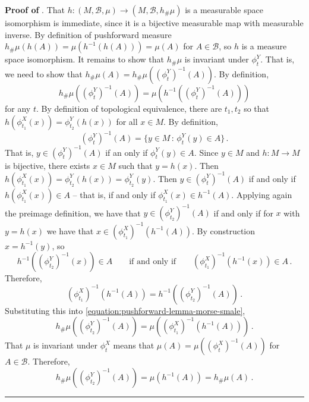 \documentclass[12pt]{article}
\newcommand{\BlackBox}{\rule{1.5ex}{1.5ex}}  %
\begin{document}
\vspace{0.5em}
\noindent
{\bf Proof of }. That $h: (M, \mathcal{B}, \mu) \rightarrow (M, \mathcal{B}, h_{\#}\mu)$ is a measurable space isomorphism is immediate, since it is a bijective measurable map with measurable inverse. By definition of pushforward measure $h_{\#}\mu(h(A)) = \mu(h^{-1}(h(A)))= \mu(A)$ for $A \in \mathcal{B}$, so $h$ is a measure space isomorphism. It remains to show that $h_{\#}\mu$ is invariant under $\phi_t^Y$. That is, we need to show that $h_{\#}\mu(A)=h_{\#}\mu((\phi_t^Y)^{-1}(A))$. By definition,
\begin{equation}
\label{equation:pushforward-lemma-morse-smale}
    h_{\#}\mu((\phi_t^Y)^{-1}(A)) = \mu\left(h^{-1} ( (\phi_t^Y)^{-1}(A))\right)
\end{equation}
for any $t$. By definition of topological equivalence, there are $t_1,t_2$ so that $h(\phi^X_{t_{1}}(x)) = \phi^Y_{t_{2}}\left( h(x)\right)$ for all $x \in M$. By definition, 
\begin{equation*}
    (\phi_t^Y)^{-1}(A) = \{ y \in M \, : \, \phi_t^Y(y) \in A\} \, .
\end{equation*}
That is, $y \in (\phi_t^Y)^{-1}(A)$ if an only if $\phi_t^Y(y) \in A$. Since $y \in M$ and $h:M \rightarrow M$ is bijective, there exists $x \in M$ such that $y = h(x)$. Then $h(\phi^X_{t_{1}}(x)) = \phi^Y_{t_{2}}\left( h(x)\right) = \phi^Y_{t_{2}}\left( y\right)$. Then $y \in (\phi_t^Y)^{-1}(A)$ if and only if $h(\phi^X_{t_{1}}(x)) \in A$ -- that is, if and only if $\phi^X_{t_{1}}(x) \in h^{-1}(A)$. Applying again the preimage definition, we have that $y \in (\phi_{t_2}^Y)^{-1}(A)$ if and only if for $x$ with $y=h(x)$ we have that $x \in (\phi^X_{t_{1}})^{-1} (h^{-1}(A))$. By construction $x = h^{-1}(y)$, so 
\begin{equation*}
    h^{-1}((\phi_{t_2}^Y)^{-1}(x)) \in A \qquad \text{if and only if}\qquad (\phi^X_{t_{1}})^{-1} (h^{-1}(x)) \in A \,.
\end{equation*}
Therefore,
\begin{equation*}
    (\phi^X_{t_{1}})^{-1} (h^{-1}(A)) = h^{-1}((\phi_{t_2}^Y)^{-1}(A)) \,.
\end{equation*}
Substituting this into \eqref{equation:pushforward-lemma-morse-smale},
\begin{equation*}
    h_{\#}\mu((\phi_{t_2}^Y)^{-1}(A)) = \mu\left((\phi^X_{t_{1}})^{-1} (h^{-1}(A))\right) \,.
\end{equation*}
That $\mu$ is invariant under $\phi_t^X$ means that $\mu(A) = \mu((\phi_t^X)^{-1}(A))$ for $A \in \mathcal{B}$. Therefore,
\begin{equation*}
    h_{\#}\mu((\phi_{t_2}^Y)^{-1}(A)) = \mu\left( h^{-1}(A)\right) = h_{\#}\mu(A) \,.
\end{equation*}
\hfill\BlackBox
\end{document}
